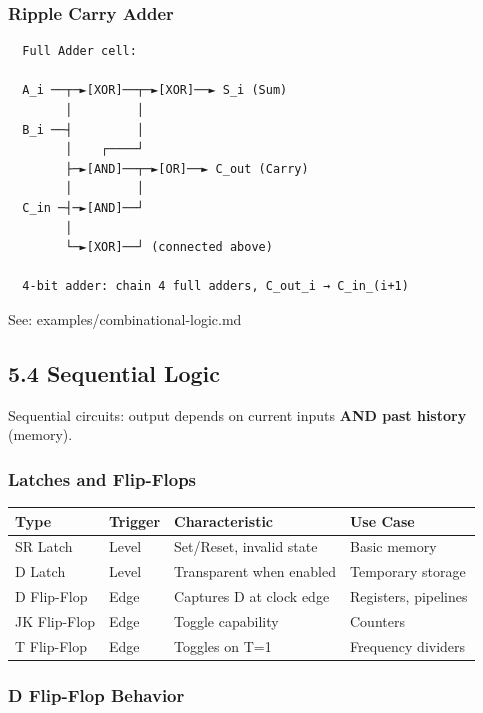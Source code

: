 \documentclass[11pt,a4paper]{book}
\begin{document}
\subsubsection{Ripple Carry Adder}

\begin{lstlisting}
  Full Adder cell:
  
  A_i ──┬─►[XOR]──┬─►[XOR]──► S_i (Sum)
        │         │
  B_i ──┤         │
        │    ┌────┘
        ├─►[AND]──┬─►[OR]──► C_out (Carry)
        │         │
  C_in ─┤─►[AND]──┘
        │
        └─►[XOR]──┘ (connected above)
  
  4-bit adder: chain 4 full adders, C_out_i → C_in_(i+1)
\end{lstlisting}

See: examples/combinational-logic.md

\medskip\noindent\hrulefill\medskip

\subsection{5.4 Sequential Logic}

Sequential circuits: output depends on current inputs \textbf{AND past history} (memory).

\subsubsection{Latches and Flip-Flops}

\begin{center}
\begin{tabular}{|l|l|l|l|}
\hline
Type & Trigger & Characteristic & Use Case \\
\hline
SR Latch & Level & Set/Reset, invalid state & Basic memory \\
D Latch & Level & Transparent when enabled & Temporary storage \\
D Flip-Flop & Edge & Captures D at clock edge & Registers, pipelines \\
JK Flip-Flop & Edge & Toggle capability & Counters \\
T Flip-Flop & Edge & Toggles on T=1 & Frequency dividers \\
\hline
\end{tabular}
\end{center}

\subsubsection{D Flip-Flop Behavior}
\end{document}
